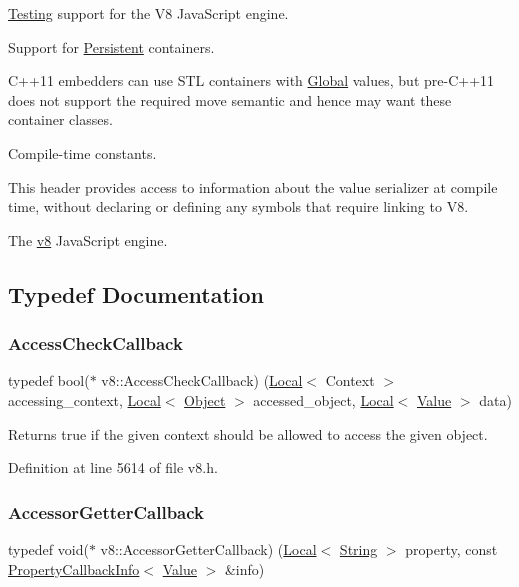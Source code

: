 \mbox{\hyperlink{classv8_1_1Testing}{Testing}} support for the V8 Java\+Script engine.

Support for \mbox{\hyperlink{classv8_1_1Persistent}{Persistent}} containers.

C++11 embedders can use S\+TL containers with \mbox{\hyperlink{classv8_1_1Global}{Global}} values, but pre-\/\+C++11 does not support the required move semantic and hence may want these container classes.

Compile-\/time constants.

This header provides access to information about the value serializer at compile time, without declaring or defining any symbols that require linking to V8.

The \mbox{\hyperlink{namespacev8}{v8}} Java\+Script engine. 

\subsection{Typedef Documentation}
\mbox{\label{namespacev8_a1024fb358d107c1494163217830688e6}} 
\subsubsection{\texorpdfstring{Access\+Check\+Callback}{AccessCheckCallback}}
{\footnotesize\ttfamily typedef bool($\ast$ v8\+::\+Access\+Check\+Callback) (\mbox{\hyperlink{classv8_1_1Local}{Local}}$<$ Context $>$ accessing\+\_\+context, \mbox{\hyperlink{classv8_1_1Local}{Local}}$<$ \mbox{\hyperlink{classv8_1_1Object}{Object}} $>$ accessed\+\_\+object, \mbox{\hyperlink{classv8_1_1Local}{Local}}$<$ \mbox{\hyperlink{classv8_1_1Value}{Value}} $>$ data)}

Returns true if the given context should be allowed to access the given object. 

Definition at line 5614 of file v8.\+h.

\mbox{\label{namespacev8_a722613c87061708a4f1aa050d095f868}} 
\subsubsection{\texorpdfstring{Accessor\+Getter\+Callback}{AccessorGetterCallback}}
{\footnotesize\ttfamily typedef void($\ast$ v8\+::\+Accessor\+Getter\+Callback) (\mbox{\hyperlink{classv8_1_1Local}{Local}}$<$ \mbox{\hyperlink{classv8_1_1String}{String}} $>$ property, const \mbox{\hyperlink{classv8_1_1PropertyCallbackInfo}{Property\+Callback\+Info}}$<$ \mbox{\hyperlink{classv8_1_1Value}{Value}} $>$ \&info)}

